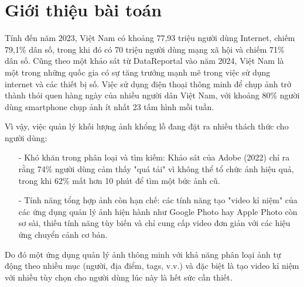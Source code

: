 \section{Giới thiệu bài toán}

Tính đến năm 2023, Việt Nam có khoảng 77,93 triệu người dùng Internet, chiếm 79,1\% dân số, trong khi đó có 70 triệu người dùng mạng xã hội và chiếm 71\% dân số\cite{vnetwork2023}. Cũng theo một khảo sát từ DataReportal vào năm 2024, Việt Nam là một trong những quốc gia có sự tăng trưởng mạnh mẽ trong việc sử dụng internet và các thiết bị số\cite{datareportal}. Việc sử dụng điện thoại thông minh để chụp ảnh trở thành thói quen hàng ngày của nhiều người dân Việt Nam, với khoảng 80\% người dùng smartphone chụp ảnh ít nhất 23 tấm hình mỗi tuần\cite{qandme}.

Vì vậy, việc quản lý khối lượng ảnh khổng lồ đang đặt ra nhiều thách thức cho người dùng:
\begin{itemize}
	\item[-] Khó khăn trong phân loại và tìm kiếm: Khảo sát của Adobe (2022)\cite{catchlight} chỉ ra rằng 74\% người dùng cảm thấy "quá tải" vì không thể tổ chức ảnh hiệu quả, trong khi 62\% mất hơn 10 phút để tìm một bức ảnh cũ.
	\item[-] Tính năng tổng hợp ảnh còn hạn chế: các tính năng tạo "video kỉ niệm" của các ứng dụng quản lý ảnh hiện hành như Google Photo hay Apple Photo còn sơ sài, thiếu tính năng tùy biến và chỉ cung cấp video đơn giản với các hiệu ứng chuyển cảnh cơ bản\cite{usmobile}.
\end{itemize}

Do đó một ứng dụng quản lý ảnh thông minh với khả năng phân loại ảnh tự động theo nhiều mục (người, địa điểm, tags, v.v.) và đặc biệt là tạo video kỉ niệm với nhiều tùy chọn cho người dùng lúc này là hết sức cần thiết.


